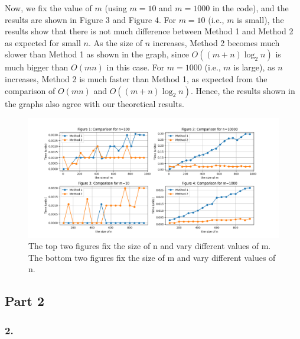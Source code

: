 \documentclass{article}
\begin{document}
Now, we fix the value of \( m \) (using \( m = 10 \) and \( m = 1000 \) in the code), and the results are shown in Figure 3 and Figure 4.  
For \( m = 10 \) (i.e., \( m \) is small), the results show that there is not much difference between Method 1 and Method 2 as expected for small \( n \).  
As the size of \( n \) increases, Method 2 becomes much slower than Method 1 as shown in the graph, since \( O((m + n) \log_2 n) \) is much bigger than \( O(mn) \) in this case.  
For \( m = 1000 \) (i.e., \( m \) is large), as \( n \) increases, Method 2 is much faster than Method 1, as expected from the comparison of \( O(mn) \) and \( O((m + n) \log_2 n) \).  
Hence, the results shown in the graphs also agree with our theoretical results.

\begin{figure}[h!]
\centering
\includegraphics[width=1.1\textwidth]{Figure_1.png}

\caption{The top two figures fix the size of n and vary different values of m. The bottom two figures fix the size of m and vary different values of n. }
\label{fig1}
\end{figure}



\vspace{0.25in}

\subsection*{Part 2}

\subsubsection*{2.}
\end{document}
